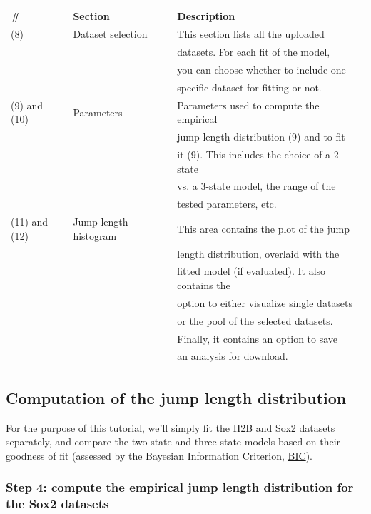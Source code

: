 \begin{center}
  \label{table:table3}
  \begin{tabular}{lll}
    \# & Section & Description\\
    \hline
    (8) & Dataset selection & This section lists all the uploaded \\&&datasets. For each fit of the model, \\&&you can choose whether to include one \\&&specific dataset for fitting or not.\\
    (9) and (10) & Parameters & Parameters used to compute the empirical \\&&jump length distribution (9) and to fit \\&&it (9). This includes the choice of a 2-state \\&&vs. a 3-state model, the range of the \\&&tested parameters, etc.\\
    (11) and (12) & Jump length histogram & This area contains the plot of the jump \\&&length distribution, overlaid with the \\&&fitted model (if evaluated). It also contains the \\&&option to either visualize single datasets \\&&or the pool of the selected datasets. \\&&Finally, it contains an option to save \\&&an analysis for download.\\
  \end{tabular}
\end{center}

\subsection{Computation of the jump length distribution}
For the purpose of this tutorial, we'll simply fit the H2B and Sox2 datasets separately, and compare the two-state and three-state models based on their goodness of fit (assessed by the Bayesian Information Criterion, \href{https://en.wikipedia.org/wiki/Bayesian_information_criterion}{BIC}).

\subsubsection{Step 4: compute the empirical jump length distribution for the Sox2 datasets}

